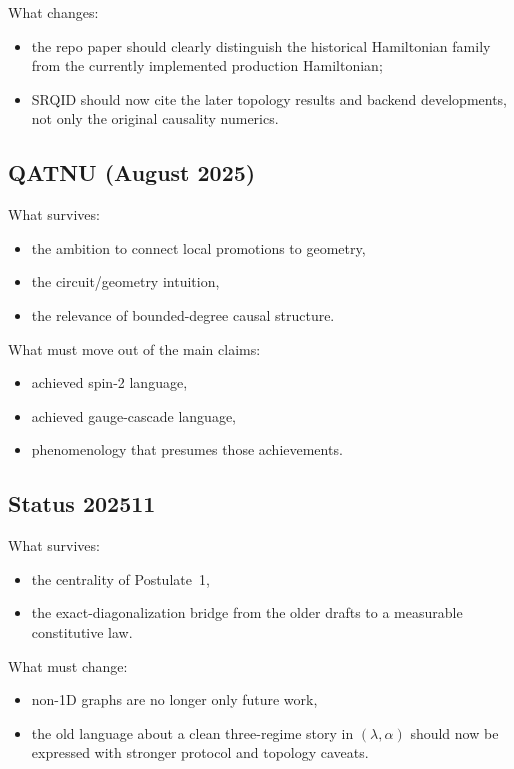 \documentclass[11pt]{article}
\begin{document}
What changes:
\begin{itemize}
    \item the repo paper should clearly distinguish the historical Hamiltonian family from the currently implemented production Hamiltonian;
    \item SRQID should now cite the later topology results and backend developments, not only the original causality numerics.
\end{itemize}

\subsection*{QATNU (August 2025)}

What survives:
\begin{itemize}
    \item the ambition to connect local promotions to geometry,
    \item the circuit/geometry intuition,
    \item the relevance of bounded-degree causal structure.
\end{itemize}

What must move out of the main claims:
\begin{itemize}
    \item achieved spin-2 language,
    \item achieved gauge-cascade language,
    \item phenomenology that presumes those achievements.
\end{itemize}

\subsection*{Status 202511}

What survives:
\begin{itemize}
    \item the centrality of Postulate~1,
    \item the exact-diagonalization bridge from the older drafts to a measurable constitutive law.
\end{itemize}

What must change:
\begin{itemize}
    \item non-1D graphs are no longer only future work,
    \item the old language about a clean three-regime story in $(\lambda,\alpha)$ should now be expressed with stronger protocol and topology caveats.
\end{itemize}
\end{document}
